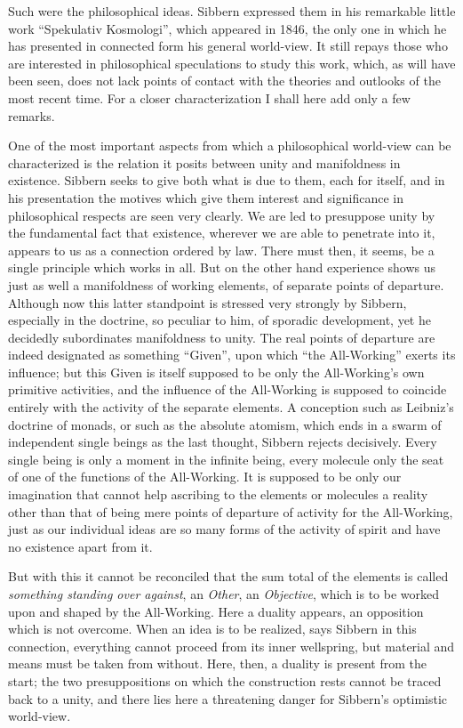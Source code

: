 \documentclass[12pt,a4paper,openany]{book}
\newcommand{\opage}[1]{\marginnote{\footnotesize\textit{[#1]}}}
\begin{document}
Such were the philosophical ideas. Sibbern expressed them in his
remarkable little work ``Spekulativ Kosmologi'', which appeared in 1846,
the only one in which he has presented in connected form his
general world-view. It still repays those
who are interested in philosophical speculations to study
this work, which, as will have been seen, does not lack
points of contact with the theories and outlooks of the most recent time.
For a closer characterization I shall here add only a few
remarks.

One of the most important aspects from which a philosophical
world-view can be characterized is the relation it posits
between unity and manifoldness in existence. Sibbern seeks
to give both what is due to them, each for itself, and in
his presentation the motives which give them
interest and significance in philosophical respects are seen very clearly. We are led to
presuppose unity by the fundamental fact that existence,
wherever we are able to penetrate into it, appears to us as
a connection ordered by law. There must then, it seems, be a
single principle which works in all. But on the other hand
experience shows us just as well a manifoldness of working
elements, of separate points of departure. Although now this
latter standpoint is stressed very strongly by Sibbern, especially in the
doctrine, so peculiar to him, of sporadic development,
yet he decidedly subordinates manifoldness to
\opage{89}unity. The real points of departure are indeed designated as something
``Given'', upon which ``the All-Working'' exerts its influence; but
this Given is itself supposed to be only the All-Working's own
primitive activities, and the influence of the All-Working is supposed to
coincide entirely with the activity of the separate elements. A
conception such as Leibniz's doctrine of monads, or such as the absolute
atomism, which ends in a swarm of independent single beings as the
last thought, Sibbern rejects decisively. Every single being
is only a moment in the infinite being, every molecule
only the seat of one of the functions of the All-Working. It is
supposed to be only our imagination that cannot help ascribing to
the elements or molecules a reality other than that of
being mere points of departure of activity for the All-Working,
just as our individual ideas are so many forms
of the activity of spirit and have no existence apart
from it.

But with this it cannot be reconciled that the sum total of
the elements is called \emph{something standing over against}, an \emph{Other}, an \emph{Objective},
which is to be worked upon and shaped by the All-Working. Here
a duality appears, an opposition which is not
overcome. When an idea is to be realized, says Sibbern in
this connection, everything cannot proceed from its inner
wellspring, but material and means must be taken from without. Here, then,
a duality is present from the start; the two presuppositions
on which the construction rests cannot be traced back to a unity,
and there lies here a threatening danger for Sibbern's optimistic
world-view.
\end{document}
